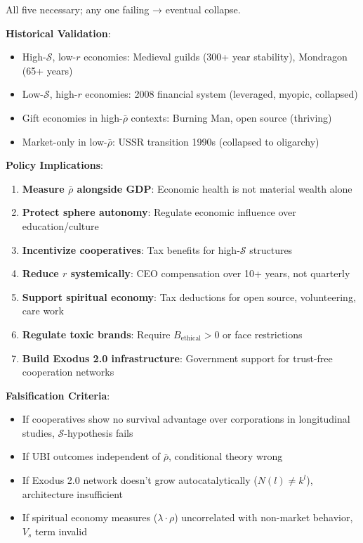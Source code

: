 \documentclass[11pt,a4paper]{article}
\theoremstyle{definition}
\theoremstyle{remark}
\begin{document}
\begin{small}
\begin{enumerate}
\begin{mdframed}[backgroundcolor=green!10,linewidth=2pt,linecolor=green!70!black]
All five necessary; any one failing → eventual collapse.

\textbf{Historical Validation}:
\begin{itemize}[nosep]
    \item High-\(\mathcal{S}\), low-\(r\) economies: Medieval guilds (300+ year stability), Mondragon (65+ years)
    \item Low-\(\mathcal{S}\), high-\(r\) economies: 2008 financial system (leveraged, myopic, collapsed)
    \item Gift economies in high-\(\bar{\rho}\) contexts: Burning Man, open source (thriving)
    \item Market-only in low-\(\bar{\rho}\): USSR transition 1990s (collapsed to oligarchy)
\end{itemize}

\textbf{Policy Implications}:
\begin{enumerate}[nosep]
    \item \textbf{Measure \(\bar{\rho}\) alongside GDP}: Economic health is not material wealth alone
    \item \textbf{Protect sphere autonomy}: Regulate economic influence over education/culture
    \item \textbf{Incentivize cooperatives}: Tax benefits for high-\(\mathcal{S}\) structures
    \item \textbf{Reduce \(r\) systemically}: CEO compensation over 10+ years, not quarterly
    \item \textbf{Support spiritual economy}: Tax deductions for open source, volunteering, care work
    \item \textbf{Regulate toxic brands}: Require \(B_{\text{ethical}} > 0\) or face restrictions
    \item \textbf{Build Exodus 2.0 infrastructure}: Government support for trust-free cooperation networks
\end{enumerate}

\textbf{Falsification Criteria}:
\begin{itemize}[nosep]
    \item If cooperatives show no survival advantage over corporations in longitudinal studies, \(\mathcal{S}\)-hypothesis fails
    \item If UBI outcomes independent of \(\bar{\rho}\), conditional theory wrong
    \item If Exodus 2.0 network doesn't grow autocatalytically (\(N(l) \neq k^l\)), architecture insufficient
    \item If spiritual economy measures (\(\lambda \cdot \rho\)) uncorrelated with non-market behavior, \(V_s\) term invalid
\end{itemize}


\end{mdframed}
\end{enumerate}
\end{small}
\end{document}
